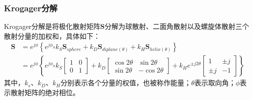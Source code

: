 \subsubsection{Krogager分解}
Krogager分解是将极化散射矩阵$\textbf{S}$分解为球散射、二面角散射以及螺旋体散射三个散射分量的加权和，具体如下：
\begin{equation}
    \begin{aligned}
        \textbf{S} & =e^{j \phi}\left\{e^{j \phi_S} k_S \textbf{S}_{sphere}+k_D \textbf{S}_{diplane(\theta)}+k_H \textbf{S}_{helix(\theta)}\right\}                 \\
                   & =e^{j \phi}\left\{e^{j \phi_S} k_S\left[\begin{array}{ll}
                                                                     1 & 0 \\
                                                                     0 & 1
                                                                 \end{array}\right]+k_D\left[\begin{array}{cc}
                                                                                                 \cos 2 \theta & \sin 2 \theta  \\
                                                                                                 \sin 2 \theta & -\cos 2 \theta
                                                                                             \end{array}\right]+k_H e^{ \pm j 2 \theta}\left[\begin{array}{cc}
                                                                                                                                                 1     & \pm j \\
                                                                                                                                                 \pm j & -1
                                                                                                                                             \end{array}\right]\right\}
    \end{aligned}
\end{equation}
其中，$k_s$、$k_D$、$k_H$分别表示各个分量的权值，也被称作能量；$\theta$表示取向角；$\phi$表示散射矩阵的绝对相位。

